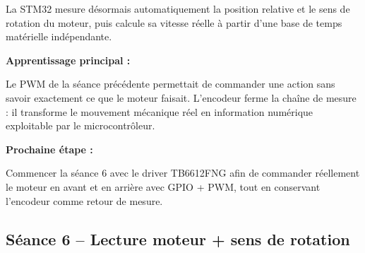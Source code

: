 \documentclass[11pt,a4paper]{article}
\begin{document}
\begin{sessionbox}
		La STM32 mesure désormais automatiquement la position relative et le sens de rotation du moteur, puis calcule sa vitesse réelle à partir d'une base de temps matérielle indépendante.
		
		\vspace{0.3cm}
		
		\textbf{Apprentissage principal :}
		
		Le PWM de la séance précédente permettait de commander une action sans savoir exactement ce que le moteur faisait. L'encodeur ferme la chaîne de mesure : il transforme le mouvement mécanique réel en information numérique exploitable par le microcontrôleur.
		
		\vspace{0.3cm}
		
		\textbf{Prochaine étape :}
		
		Commencer la séance 6 avec le driver TB6612FNG afin de commander réellement le moteur en avant et en arrière avec GPIO + PWM, tout en conservant l'encodeur comme retour de mesure.
		
	\end{sessionbox}
	
	\subsection*{Séance 6 -- Lecture moteur + sens de rotation}
	
\end{document}
